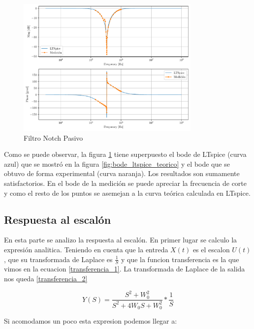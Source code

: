 \documentclass[12pt,a4paper]{article}
\begin{document}
\begin{figure}[ht]                                                       
    \centering\includegraphics[width=0.8\textwidth]{Superpuesto.pdf}
    \caption{Filtro Notch Pasivo}
    \label{fig:superpuesto}
   \end{figure}

Como se puede observar, la figura \ref{fig:superpuesto} tiene superpuesto el bode
de LTspice (curva azul) que se mostró en la figura \ref{fig:bode_ltspice_teorico} y el bode que se obtuvo de
forma experimental (curva naranja). Los resultados son 
sumamente satisfactorios. En el bode de la medición se puede apreciar la frecuencia de corte y como
el resto de los puntos se asemejan a la curva teórica calculada en LTspice. 



\subsection{Respuesta al escalón}
En esta parte se analizo la respuesta al escalón. En primer lugar se calculo la expresión analitica. Teniendo en cuenta que 
la entreda $X(t)$ es el escalon $U(t)$, que su transformada de Laplace es $\frac{1}{S}$ y que la funcion transferencia es la que 
vimos en la ecuacion \ref{transferencia_1}. La transformada de Laplace de la salida nos queda \ref{transferencia_2}


\begin{equation} Y(S) = \frac{S^2+W_{0}^2}{S^2+4W_{0}S+W_{0}^2} * \frac{1}{S}  \label{transferencia_2}\end{equation}

Si acomodamos un poco esta expresion podemos llegar a: \\
\end{document}
